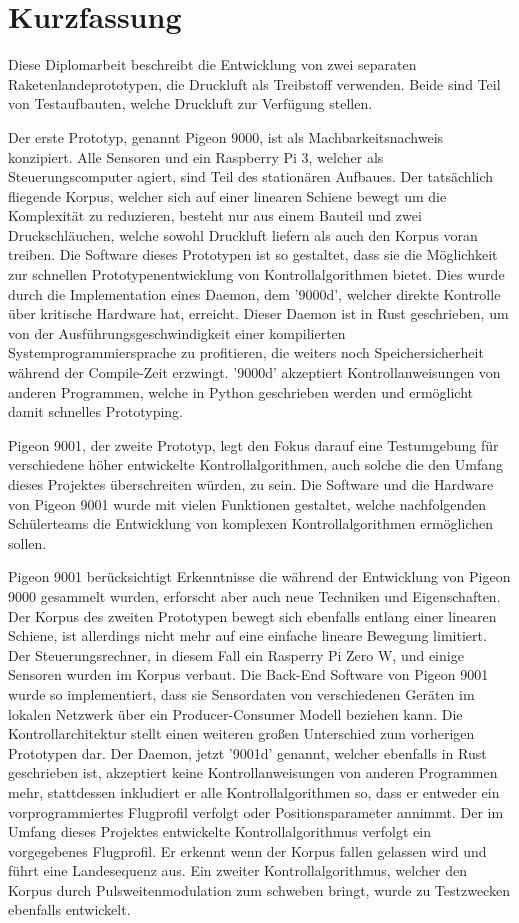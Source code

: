 \chapter{Kurzfassung}

Diese Diplomarbeit beschreibt die Entwicklung von zwei separaten Raketenlandeprototypen, die Druckluft als Treibstoff verwenden. Beide sind Teil von Testaufbauten, welche Druckluft zur Verfügung stellen.

Der erste Prototyp, genannt Pigeon 9000, ist als Machbarkeitsnachweis konzipiert. Alle Sensoren und ein Raspberry Pi 3, welcher als Steuerungscomputer agiert, sind Teil des stationären Aufbaues. Der tatsächlich fliegende Korpus, welcher sich auf einer linearen Schiene bewegt um die Komplexität zu reduzieren, besteht nur aus einem Bauteil und zwei Druckschläuchen, welche sowohl Druckluft liefern als auch den Korpus voran treiben. Die Software dieses Prototypen ist so gestaltet, dass sie die Möglichkeit zur schnellen Prototypenentwicklung von Kontrollalgorithmen bietet. Dies wurde durch die Implementation eines Daemon, dem '9000d', welcher direkte Kontrolle über kritische Hardware hat, erreicht. Dieser Daemon ist in Rust geschrieben, um von der Ausführungsgeschwindigkeit einer kompilierten Systemprogrammiersprache zu profitieren, die weiters noch Speichersicherheit während der Compile-Zeit erzwingt. '9000d' akzeptiert Kontrollanweisungen von anderen Programmen, welche in Python geschrieben werden und ermöglicht damit schnelles Prototyping.

Pigeon 9001, der zweite Prototyp, legt den Fokus darauf eine Testumgebung für verschiedene höher entwickelte Kontrollalgorithmen, auch solche die den Umfang dieses Projektes überschreiten würden, zu sein. Die Software und die Hardware von Pigeon 9001 wurde mit vielen Funktionen gestaltet, welche nachfolgenden Schülerteams die Entwicklung von komplexen Kontrollalgorithmen ermöglichen sollen.

Pigeon 9001 berücksichtigt Erkenntnisse die während der Entwicklung von Pigeon 9000 gesammelt wurden, erforscht aber auch neue Techniken und Eigenschaften. Der Korpus des zweiten Prototypen bewegt sich ebenfalls entlang einer linearen Schiene, ist allerdings nicht mehr auf eine einfache lineare Bewegung limitiert. Der Steuerungsrechner, in diesem Fall ein Rasperry Pi Zero W, und einige Sensoren wurden im Korpus verbaut. Die Back-End Software von Pigeon 9001 wurde so implementiert, dass sie Sensordaten von verschiedenen Geräten im lokalen Netzwerk über ein Producer-Consumer Modell beziehen kann. Die Kontrollarchitektur stellt einen weiteren großen Unterschied zum vorherigen Prototypen dar. Der Daemon, jetzt '9001d' genannt, welcher ebenfalls in Rust geschrieben ist, akzeptiert keine Kontrollanweisungen von anderen Programmen mehr, stattdessen inkludiert er alle Kontrollalgorithmen so, dass er entweder ein vorprogrammiertes Flugprofil verfolgt oder Positionsparameter annimmt. Der im Umfang dieses Projektes entwickelte Kontrollalgorithmus verfolgt ein vorgegebenes Flugprofil. Er erkennt wenn der Korpus fallen gelassen wird und führt eine Landesequenz aus. Ein zweiter Kontrollalgorithmus, welcher den Korpus durch Pulsweitenmodulation zum schweben bringt, wurde zu Testzwecken ebenfalls entwickelt.